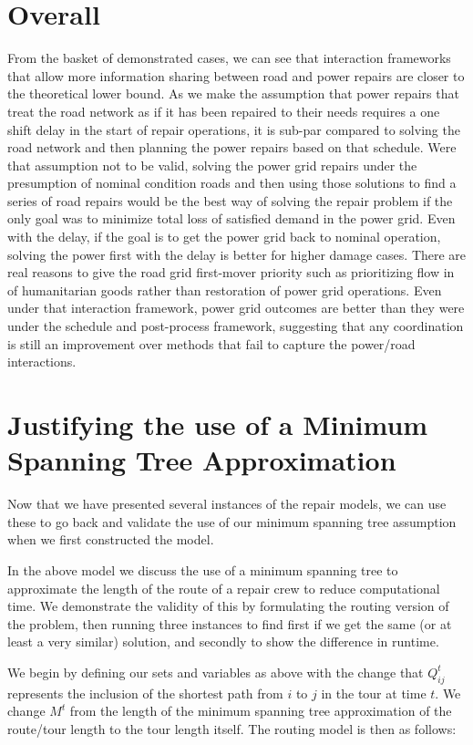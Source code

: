 \section{Overall}
From the basket of demonstrated cases, we can see that interaction frameworks that allow more information sharing between road and power repairs are closer to the theoretical lower bound. As we make the assumption that power repairs that treat the road network as if it has been repaired to their needs requires a one shift delay in the start of repair operations, it is sub-par compared to solving the road network and then planning the power repairs based on that schedule. Were that assumption not to be valid, solving the power grid repairs under the presumption of nominal condition roads and then using those solutions to find a series of road repairs would be the best way of solving the repair problem if the only goal was to minimize total loss of satisfied demand in the power grid. Even with the delay, if the goal is to get the power grid back to nominal operation, solving the power first with the delay is better for higher damage cases. There are real reasons to give the road grid first-mover priority such as prioritizing flow in of humanitarian goods rather than restoration of power grid operations. Even under that interaction framework, power grid outcomes are better than they were under the schedule and post-process framework, suggesting that any coordination is still an improvement over methods that fail to capture the power/road interactions.


\section{Justifying the use of a Minimum Spanning Tree Approximation}

Now that we have presented several instances of the repair models, we can use these to go back and validate the use of our minimum spanning tree assumption when we first constructed the model.

In the above model we discuss the use of a minimum spanning tree to approximate the length of the route of a repair crew to reduce computational time. We demonstrate the validity of this by formulating the routing version of the problem, then running three instances to find first if we get the same (or at least a very similar) solution, and secondly to show the difference in runtime.

We begin by defining our sets and variables as above with the change that $Q_{ij}^t$ represents the inclusion of the shortest path from $i$ to $j$ in the tour at time $t$. We change $M^t$ from the length of the minimum spanning tree approximation of the route/tour length to the tour length itself. The routing model is then as follows:

